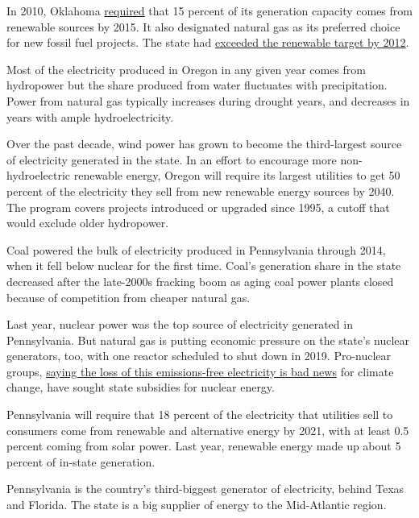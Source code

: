 In 2010, Oklahoma
\href{http://programs.dsireusa.org/system/program/detail/4178}{requ}\href{http://programs.dsireusa.org/system/program/detail/4178}{ired}
that 15 percent of its generation capacity comes from renewable sources
by 2015. It also designated natural gas as its preferred choice for new
fossil fuel projects. The state had
\href{http://digitalprairie.ok.gov/cdm/ref/collection/stgovpub/id/216170}{exceeded
the renewable target by 2012}.

Most of the electricity produced in Oregon in any given year comes from
hydropower but the share produced from water fluctuates with
precipitation. Power from natural gas typically increases during drought
years, and decreases in years with ample hydroelectricity.

Over the past decade, wind power has grown to become the third-largest
source of electricity generated in the state. In an effort to encourage
more non-hydroelectric renewable energy, Oregon will require its largest
utilities to get 50 percent of the electricity they sell from new
renewable energy sources by 2040. The program covers projects introduced
or upgraded since 1995, a cutoff that would exclude older hydropower.

Coal powered the bulk of electricity produced in Pennsylvania through
2014, when it fell below nuclear for the first time. Coal's generation
share in the state decreased after the late-2000s fracking boom as aging
coal power plants closed because of competition from cheaper natural
gas.

Last year, nuclear power was the top source of electricity generated in
Pennsylvania. But natural gas is putting economic pressure on the
state's nuclear generators, too, with one reactor scheduled to shut down
in 2019. Pro-nuclear groups,
\href{https://www.npr.org/sections/thetwo-way/2017/05/30/530708793/three-mile-island-nuclear-power-plant-to-shut-down-in-2019}{saying
the loss of this emissions-free electricity is bad news} for climate
change, have sought state subsidies for nuclear energy.

Pennsylvania will require that 18 percent of the electricity that
utilities sell to consumers come from renewable and alternative energy
by 2021, with at least 0.5 percent coming from solar power. Last year,
renewable energy made up about 5 percent of in-state generation.

Pennsylvania is the country's third-biggest generator of electricity,
behind Texas and Florida. The state is a big supplier of energy to the
Mid-Atlantic region.


